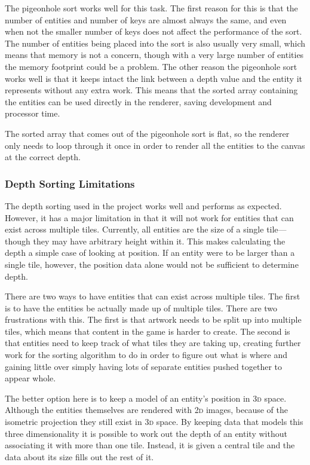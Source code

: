 The pigeonhole sort works well for this task. The first reason for this is that the number of entities and number of keys are almost always the same, and even when not the smaller number of keys does not affect the performance of the sort. The number of entities being placed into the sort is also usually very small, which means that memory is not a concern, though with a very large number of entities the memory footprint could be a problem. The other reason the pigeonhole sort works well is that it keeps intact the link between a depth value and the entity it represents without any extra work. This means that the sorted array containing the entities can be used directly in the renderer, saving development and processor time.

The sorted array that comes out of the pigeonhole sort is flat, so the renderer only needs to loop through it once in order to render all the entities to the canvas at the correct depth.

\subsubsection{Depth Sorting Limitations}\label{depth_limits}
The depth sorting used in the project works well and performs as expected. However, it has a major limitation in that it will not work for entities that can exist across multiple tiles. Currently, all entities are the size of a single tile---though they may have arbitrary height within it. This makes calculating the depth a simple case of looking at position. If an entity were to be larger than a single tile, however, the position data alone would not be sufficient to determine depth.

There are two ways to have entities that can exist across multiple tiles. The first is to have the entities be actually made up of multiple tiles. There are two frustrations with this. The first is that artwork needs to be split up into multiple tiles, which means that content in the game is harder to create. The second is that entities need to keep track of what tiles they are taking up, creating further work for the sorting algorithm to do in order to figure out what is where and gaining little over simply having lots of separate entities pushed together to appear whole.

The better option here is to keep a model of an entity's position in \textsc{3d} space. Although the entities themselves are rendered with \textsc{2d} images, because of the isometric projection they still exist in \textsc{3d} space. By keeping data that models this three dimensionality it is possible to work out the depth of an entity without associating it with more than one tile. Instead, it is given a central tile and the data about its size fills out the rest of it.

